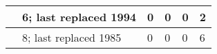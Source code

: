 \begin{tabular}{V{.15\columnwidth}|V{.15\columnwidth}|V{.15\columnwidth}|V{.15\columnwidth}|V{.15\columnwidth}|V{.15\columnwidth}|}
        & 6; last replaced 1994                                                & 0           & 0      & 0                                                             & 2                                                             \\ \hline
{}        & 8; last replaced 1985                                                & 0           & 0      & 0                                                             & 6                                                             \\ \hline
\end{tabular}